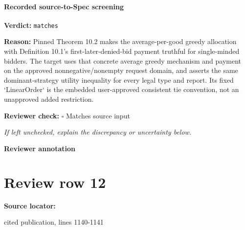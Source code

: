 \documentclass[10pt]{article}
\newcommand{\reviewerbox}{%
  \par\noindent\fbox{\parbox{0.96\linewidth}{\rule{0pt}{0.38in}}}\par
}
\newcommand{\reviewmatch}[1]{%
  \par\noindent\textbf{Reviewer check:} $\square$\; #1\par
  \noindent\emph{If left unchecked, explain the discrepancy or uncertainty below.}\par
}
\begin{document}
\paragraph{Recorded source-to-Spec screening}
\textbf{Verdict:} \texttt{matches}
\\
{\raggedright
\textbf{Reason:} Pinned Theorem 10.\allowbreak{}2 makes the average-\allowbreak{}per-\allowbreak{}good greedy allocation with Definition 10.\allowbreak{}1's first-\allowbreak{}later-\allowbreak{}denied-\allowbreak{}bid payment truthful for single-\allowbreak{}minded bidders.\allowbreak{} The target uses that concrete average greedy mechanism and payment on the approved nonnegative/\allowbreak{}nonempty request domain, and asserts the same dominant-\allowbreak{}strategy utility inequality for every legal type and report.\allowbreak{} Its fixed `LinearOrder` is the embedded user-\allowbreak{}approved consistent tie convention, not an unapproved added restriction.\allowbreak{}
\par}
\reviewmatch{Matches source input}
\noindent\textbf{Reviewer annotation}\par
\reviewerbox
\clearpage
\hypertarget{source-claim-121ecc0527e2699a}{}
\section*{Review row 12}
\textbf{Source locator:} {\footnotesize\raggedright cited publication, lines 1140-\allowbreak{}1141\par}
\end{document}
